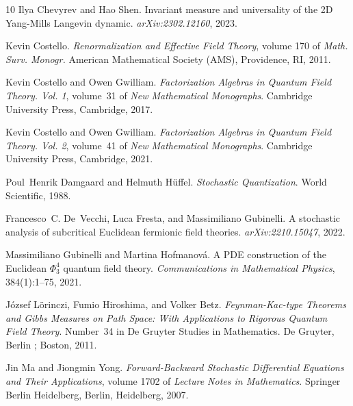 \documentclass[reprint,aps]{revtex4-2}
\newcommand{\tmtextit}[1]{\textit{{{#1}}}}
\begin{document}
\begin{thebibliography}{10}
  Ilya Chevyrev and Hao
  Shen. {\newblock}Invariant measure and universality of the 2D Yang-Mills
  Langevin dynamic. {\newblock}\tmtextit{arXiv:2302.12160}, 2023.
  
  Kevin Costello.
  {\newblock}\tmtextit{Renormalization and Effective Field Theory}, volume 170
  of \tmtextit{Math. Surv. Monogr.} {\newblock}American Mathematical Society
  (AMS), Providence, RI, 2011.
  
  Kevin Costello and
  Owen Gwilliam. {\newblock}\tmtextit{Factorization Algebras in Quantum Field
  Theory. Vol. 1}, volume~31 of \tmtextit{New Mathematical Monographs}.
  {\newblock}Cambridge University Press, Cambridge, 2017.
  
  Kevin Costello and
  Owen Gwilliam. {\newblock}\tmtextit{Factorization Algebras in Quantum Field
  Theory. Vol. 2}, volume~41 of \tmtextit{New Mathematical Monographs}.
  {\newblock}Cambridge University Press, Cambridge, 2021.
  
  Poul~Henrik Damgaard and
  Helmuth H{\"u}ffel. {\newblock}\tmtextit{Stochastic Quantization}.
  {\newblock}World Scientific, 1988.
  
  Francesco~C. De~Vecchi, Luca Fresta, and
  Massimiliano Gubinelli. {\newblock}A stochastic analysis of subcritical
  Euclidean fermionic field theories. {\newblock}\tmtextit{arXiv:2210.15047},
  2022.
  
  Massimiliano Gubinelli and Martina Hofmanov{\'a}.
  {\newblock}A PDE construction of the Euclidean $\Phi^4_3$ quantum field
  theory. {\newblock}\tmtextit{Communications in Mathematical Physics},
  384(1):1--75, 2021.
  
  J{\'o}zsef
  L{\"o}rinczi, Fumio Hiroshima, and Volker Betz.
  {\newblock}\tmtextit{Feynman-Kac-type Theorems and Gibbs Measures on Path
  Space: With Applications to Rigorous Quantum Field Theory}.
  {\newblock}Number~34 in De Gruyter Studies in Mathematics. De Gruyter,
  Berlin ; Boston, 2011.
  
  Jin Ma and Jiongmin
  Yong. {\newblock}\tmtextit{Forward-Backward Stochastic Differential
  Equations and Their Applications}, volume 1702 of \tmtextit{Lecture Notes in
  Mathematics}. {\newblock}Springer Berlin Heidelberg, Berlin, Heidelberg,
  2007.
  

\end{thebibliography}
\end{document}

